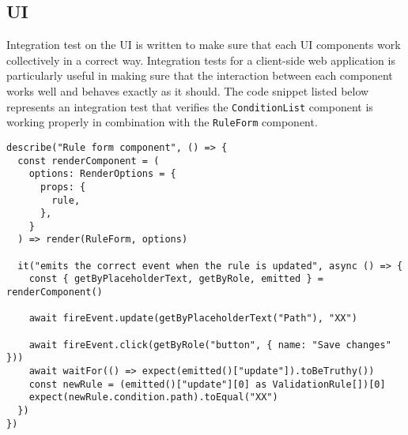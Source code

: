   \subsection{UI}

    Integration test on the UI is written to make sure that each UI components work collectively in a correct way. Integration tests for a client-side web application is particularly useful in making sure that the interaction between each component works well and behaves exactly as it should. The code snippet listed below represents an integration test that verifies the \verb;ConditionList; component is working properly in combination with the \verb;RuleForm; component. 
    
    \begin{lstlisting}[style=es6, caption={Integration test on the UI (TypeScript)}]
describe("Rule form component", () => {
  const renderComponent = (
    options: RenderOptions = {
      props: {
        rule,
      },
    }
  ) => render(RuleForm, options)

  it("emits the correct event when the rule is updated", async () => {
    const { getByPlaceholderText, getByRole, emitted } = renderComponent()

    await fireEvent.update(getByPlaceholderText("Path"), "XX")

    await fireEvent.click(getByRole("button", { name: "Save changes" }))
    await waitFor(() => expect(emitted()["update"]).toBeTruthy())
    const newRule = (emitted()["update"][0] as ValidationRule[])[0]
    expect(newRule.condition.path).toEqual("XX")
  })
})
    \end{lstlisting}
